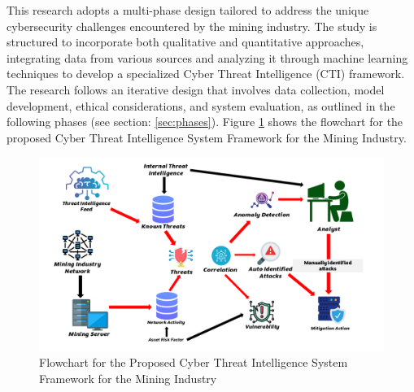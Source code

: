 \documentclass[a4paper,twoside,12pt]{report}
\begin{document}
This research adopts a multi-phase design tailored to address the unique cybersecurity challenges encountered by the mining industry. The study is structured to incorporate both qualitative and quantitative approaches, integrating data from various sources and analyzing it through machine learning techniques to develop a specialized Cyber Threat Intelligence (CTI) framework. The research follows an iterative design that involves data collection, model development, ethical considerations, and system evaluation, as outlined in the following phases (see section: \ref{sec:phases}). Figure \ref{fig:thing31} shows the flowchart for the proposed Cyber Threat Intelligence System Framework for the Mining Industry.
\begin{figure}[ht]
    \label{fig:thing31}
    \centering
    \includegraphics[width=1.0\linewidth]{images/cti-framwork-flowchart.png}  %
    \caption{Flowchart for the Proposed Cyber Threat Intelligence System Framework for the Mining Industry}
\end{figure}


\end{document}
